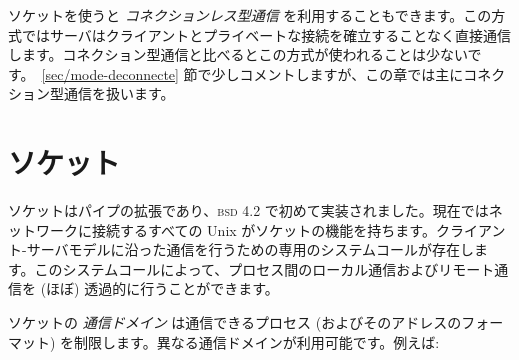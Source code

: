 ソケットを使うと \emph{コネクションレス型通信} を利用することもできます。この方式ではサーバはクライアントとプライベートな接続を確立することなく直接通信します。コネクション型通信と比べるとこの方式が使われることは少ないです。~\ref{sec/mode-deconnecte} 節で少しコメントしますが、この章では主にコネクション型通信を扱います。

\section{ソケット}

ソケットはパイプの拡張であり、\textsc{bsd} 4.2 で初めて実装されました。現在ではネットワークに接続するすべての Unix がソケットの機能を持ちます。クライアント-サーバモデルに沿った通信を行うための専用のシステムコールが存在します。このシステムコールによって、プロセス間のローカル通信およびリモート通信を (ほぼ) 透過的に行うことができます。

ソケットの \emph{通信ドメイン} は通信できるプロセス (およびそのアドレスのフォーマット) を制限します。異なる通信ドメインが利用可能です。例えば:


